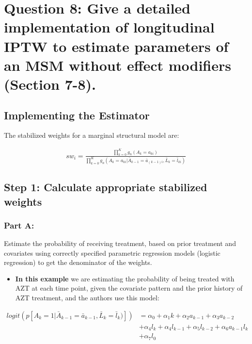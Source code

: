 \documentclass[]{article}
\providecommand{\tightlist}{%
  \setlength{\itemsep}{0pt}\setlength{\parskip}{0pt}}
\begin{document}
\section{Question 8: Give a detailed implementation of longitudinal IPTW
to estimate parameters of an MSM without effect modifiers (Section
7-8).}\label{question-8-give-a-detailed-implementation-of-longitudinal-iptw-to-estimate-parameters-of-an-msm-without-effect-modifiers-section-7-8.}

\subsection{Implementing the
Estimator}\label{implementing-the-estimator}

The stabilized weights for a marginal structural model are:

\vspace{8mm}

\begin{align*}
sw_i = \frac{\prod_{k=0}^K g_n(A_k= a_{ki})}{\prod_{k=0}^K g_n(A_k= a_{ki} | \bar{A}_{k-1} = \bar{a}_{(k-1)i}, \bar{L}_k = \bar{l}_{ki})}
\end{align*}

\subsection{Step 1: Calculate appropriate stabilized
weights}\label{step-1-calculate-appropriate-stabilized-weights}

\subsubsection{Part A:}\label{part-a}

Estimate the probability of receiving treatment, based on prior
treatment and covariates using correctly specified parametric regression
models (logistic regression) to get the denominator of the weights.

\begin{itemize}
\tightlist
\item
  \textbf{In this example} we are estimating the probability of being
  treated with AZT at each time point, given the covariate pattern and
  the prior history of AZT treatment, and the authors use this model:
\end{itemize}

\begin{align*}
logit (p[A_k = 1| \bar{A}_{k-1} = \bar{a}_{k-1}, \bar{L}_k = \bar{l}_{k})]) &= \alpha_0 + \alpha_1k + \alpha_2a_{k-1} + \alpha_3a_{k-2} \\
& + \alpha_4l_k + \alpha_4l_{k-1} + \alpha_5l_{k-2} + \alpha_6a_{k-1}l_k \\
& + \alpha_7l_0 \\
\end{align*}
\end{document}

